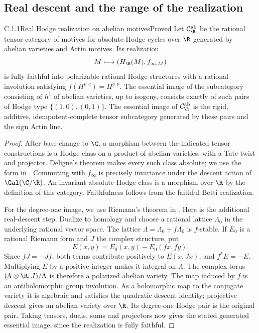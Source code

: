 \subsection{Real descent and the range of the realization}

\begin{result}{C.1.1}{Real Hodge realization on abelian motives}{Proved}
Let $\mathcal C_{\R}^{\mathrm{ab}}$ be the rational tensor category of motives for absolute Hodge cycles over $\R$ generated by abelian varieties and Artin motives. Its realization
\[
 M\longmapsto (H_{\B}(M),f_{\infty,M})
\]
is fully faithful into polarizable rational Hodge structures with a rational involution satisfying $f(H^{p,q})=H^{q,p}$. The essential image of the subcategory consisting of $h^1$ of abelian varieties, up to isogeny, consists exactly of such pairs of Hodge type $\{(1,0),(0,1)\}$. The essential image of $\mathcal C_{\R}^{\mathrm{ab}}$ is the rigid, additive, idempotent-complete tensor subcategory generated by these pairs and the sign Artin line.
\end{result}
\begin{proof}
After base change to $\C$, a morphism between the indicated tensor constructions is a Hodge class on a product of abelian varieties, with a Tate twist and projector. Deligne's theorem makes every such class absolute; we use the form in \cite[Theorem 58]{CharlesSchnell}. Commuting with $f_\infty$ is precisely invariance under the descent action of $\Gal(\C/\R)$. An invariant absolute Hodge class is a morphism over $\R$ by the definition of this category. Faithfulness follows from the faithful Betti realization.

For the degree-one image, we use Riemann's theorem in \cite[Theorem 6.20 and Proposition 6.21]{DM1982}. Here is the additional real-descent step. Dualize to homology and choose a rational lattice $\Lambda_0$ in the underlying rational vector space. The lattice $\Lambda=\Lambda_0+f\Lambda_0$ is $f$-stable. If $E_0$ is a rational Riemann form and $J$ the complex structure, put
\[
 E(x,y)=E_0(x,y)-E_0(fx,fy).
\]
Since $fJ=-Jf$, both terms contribute positively to $E(x,Jx)$, and $f^*E=-E$. Multiplying $E$ by a positive integer makes it integral on $\Lambda$. The complex torus $(\Lambda\otimes\R,J)/\Lambda$ is therefore a polarized abelian variety. The map induced by $f$ is an antiholomorphic group involution. As a holomorphic map to the conjugate variety it is algebraic and satisfies the quadratic descent identity; projective descent gives an abelian variety over $\R$. Its degree-one Hodge pair is the original pair. Taking tensors, duals, sums and projectors now gives the stated generated essential image, since the realization is fully faithful.
\end{proof}

